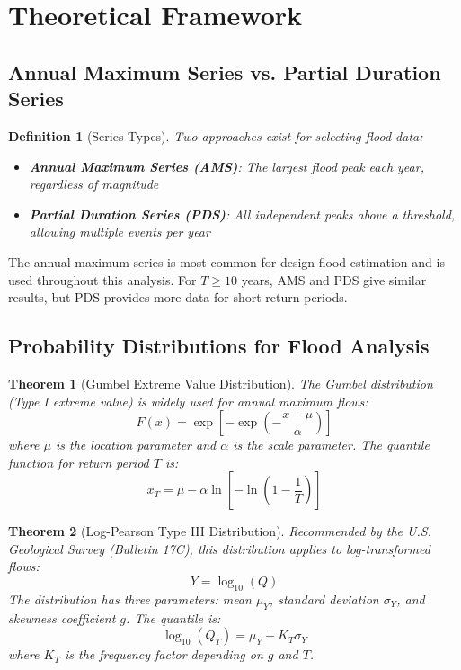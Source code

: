 \documentclass[a4paper, 11pt]{article}
\newtheorem{definition}{Definition}[section]
\newtheorem{theorem}{Theorem}[section]
\begin{document}
\section{Theoretical Framework}

\subsection{Annual Maximum Series vs. Partial Duration Series}

\begin{definition}[Series Types]
Two approaches exist for selecting flood data:
\begin{itemize}
\item \textbf{Annual Maximum Series (AMS)}: The largest flood peak each year, regardless of magnitude
\item \textbf{Partial Duration Series (PDS)}: All independent peaks above a threshold, allowing multiple events per year
\end{itemize}
\end{definition}

The annual maximum series is most common for design flood estimation and is used throughout
this analysis. For $T \geq 10$ years, AMS and PDS give similar results, but PDS provides
more data for short return periods.

\subsection{Probability Distributions for Flood Analysis}

\begin{theorem}[Gumbel Extreme Value Distribution]
The Gumbel distribution (Type I extreme value) is widely used for annual maximum flows:
\begin{equation}
F(x) = \exp\left[-\exp\left(-\frac{x - \mu}{\alpha}\right)\right]
\end{equation}
where $\mu$ is the location parameter and $\alpha$ is the scale parameter. The quantile function
for return period $T$ is:
\begin{equation}
x_T = \mu - \alpha \ln\left[-\ln\left(1 - \frac{1}{T}\right)\right]
\end{equation}
\end{theorem}

\begin{theorem}[Log-Pearson Type III Distribution]
Recommended by the U.S. Geological Survey (Bulletin 17C), this distribution applies to
log-transformed flows:
\begin{equation}
Y = \log_{10}(Q)
\end{equation}
The distribution has three parameters: mean $\mu_Y$, standard deviation $\sigma_Y$, and
skewness coefficient $g$. The quantile is:
\begin{equation}
\log_{10}(Q_T) = \mu_Y + K_T \sigma_Y
\end{equation}
where $K_T$ is the frequency factor depending on $g$ and $T$.
\end{theorem}
\end{document}
